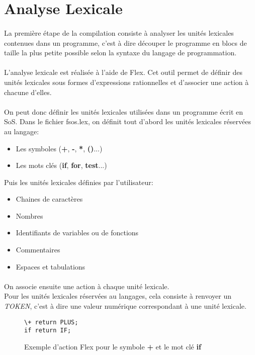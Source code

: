 \section{Analyse Lexicale}

\paragraph{}
La première étape de la compilation consiste à analyser les unités lexicales contenues dans un programme, c'est à dire découper le programme en blocs de taille la plus petite possible selon la syntaxe du langage de programmation.

\paragraph{}
L'analyse lexicale est réalisée à l'aide de \textsf{Flex}. Cet outil permet de définir des unités lexicales sous formes d'expressions rationnelles et d'associer une action à chacune d'elles.

\paragraph{}
On peut donc définir les unités lexicales utilisées dans un programme écrit en SoS. Dans le fichier \textsf{fsos.lex}, on définit tout d'abord les unités lexicales réservées au langage:
\begin{itemize}
    \item Les symboles (\textbf{+}, \textbf{-}, \textbf{*}, \textbf{()}...)
    \item Les mots clés (\textbf{if}, \textbf{for}, \textbf{test}...)
\end{itemize}
Puis les unités lexicales définies par l'utilisateur:
\begin{itemize}
    \item Chaines de caractères
    \item Nombres
    \item Identifiants de variables ou de fonctions
    \item Commentaires
    \item Espaces et tabulations
\end{itemize}

\paragraph{}
On associe ensuite une action à chaque unité lexicale.\\
Pour les unités lexicales réservées au langages, cela consiste à renvoyer un \textit{TOKEN}, c'est à dire une valeur numérique correspondant à une unité lexicale.
\begin{figure}[H]
\begin{lstlisting}
\+ return PLUS;
if return IF;
\end{lstlisting}
\caption{Exemple d'action \textsf{Flex} pour le symbole \textbf{+} et le mot clé \textbf{if}}
\end{figure}


